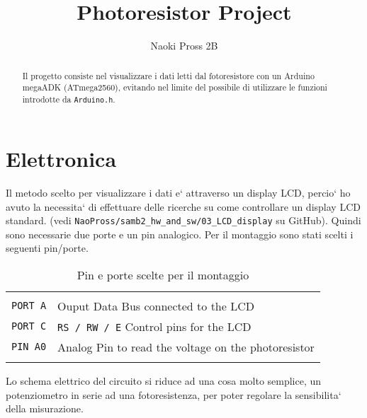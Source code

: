 \documentclass[a4paper]{IEEEtran}
\begin{document}
	\author{Naoki Pross 2B}
	\title{Photoresistor Project}
	\maketitle
	
	\begin{abstract}
		Il progetto consiste nel visualizzare i dati letti dal fotoresistore con
		un Arduino megaADK (ATmega2560), evitando nel limite del possibile di
		utilizzare le funzioni introdotte da \texttt{Arduino.h}.
	\end{abstract}
	
	\section{Elettronica}
	Il metodo scelto per visualizzare i dati e` attraverso un display LCD, percio`
	ho avuto la necessita` di effettuare delle ricerche su come controllare un display
	LCD standard. (vedi \texttt{NaoPross/samb2\_hw\_and\_sw/03\_LCD\_display} su GitHub).
	Quindi sono necessarie due porte e un pin analogico. Per il montaggio sono stati 
	scelti i seguenti pin/porte.
	
	\begin{table}[h]
		\caption{Pin e porte scelte per il montaggio}
		\centering \begin{tabular}{ l l }
			\hline \\
			\texttt{PORT A} & Ouput Data Bus connected to the LCD \\
			\texttt{PORT C} & \texttt{RS / RW / E} Control pins for the LCD\\
			\texttt{PIN A0} & Analog Pin to read the voltage on the photoresistor \\
			\\ \hline
		\end{tabular}
	\end{table}
	
	Lo schema elettrico del circuito si riduce ad una cosa molto semplice,
	un potenziometro in serie ad una fotoresistenza, per poter regolare la sensibilita`
	della misurazione.
	
\end{document}
